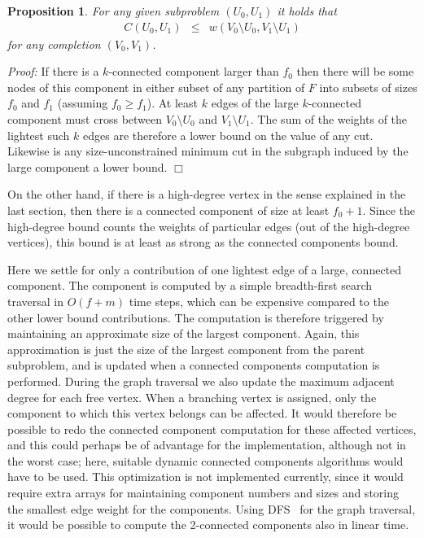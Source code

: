 \documentclass[a4paper,11pt]{article}
\newtheorem{proposition}{Proposition}
\newenvironment{proof}{\emph{Proof:}}{$\Box$\newline}
\begin{document}
\begin{proposition}
  \label{prop:component}
  For any given subproblem $(U_0,U_1)$ it holds that
  \begin{eqnarray*}
    C(U_0,U_1) & \leq & w(V_0\setminus U_0,V_1\setminus U_1)
  \end{eqnarray*}
  for any completion $(V_0,V_1)$.
\end{proposition}

\begin{proof}
  If there is a $k$-connected component larger than $f_0$ then there
  will be some nodes of this component in either subset of any partition
  of $F$ into subsets of sizes $f_0$ and $f_1$ (assuming $f_0\geq f_1$).
  At least $k$ edges of the large $k$-connected component must cross
  between $V_0\setminus U_0$ and $V_1\setminus U_1$. The sum of the weights
  of the lightest such $k$ edges are therefore a lower bound on the
  value of any cut. Likewise is any size-unconstrained minimum cut in
  the subgraph induced by the large component a lower bound.
\end{proof}

On the other hand, if there is a high-degree vertex in the sense
explained in the last section, then there is a connected component of
size at least $f_0+1$. Since the high-degree bound counts the
weights of particular edges (out of the high-degree vertices), this
bound is at least as strong as the connected components bound.

Here we settle for only a contribution of one lightest edge of a
large, connected component. The component is computed by a simple
breadth-first search traversal in $O(f+m)$ time steps, which can be
expensive compared to the other lower bound contributions.  The
computation is therefore triggered by maintaining an approximate size
of the largest component. Again, this approximation is just the size
of the largest component from the parent subproblem, and is updated
when a connected components computation is performed. During the graph
traversal we also update the maximum adjacent degree for each free
vertex. When a branching vertex is assigned, only the component to
which this vertex belongs can be affected. It would therefore be
possible to redo the connected component computation for these
affected vertices, and this could perhaps be of advantage for the
implementation, although not in the worst case; here, suitable dynamic
connected components algorithms would have to be used. This
optimization is not implemented currently, since it would require
extra arrays for maintaining component numbers and sizes and storing
the smallest edge weight for the components. Using DFS~\cite{Tarjan72}
for the graph traversal, it would be possible to compute the
2-connected components also in linear time.
\end{document}
